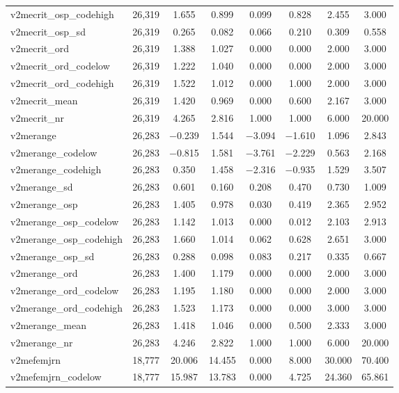 \begin{table}[!htbp]
\begin{tabular}{@{\extracolsep{5pt}}lccccccc}
v2mecrit\_osp\_codehigh & 26,319 & 1.655 & 0.899 & 0.099 & 0.828 & 2.455 & 3.000 \\ 
v2mecrit\_osp\_sd & 26,319 & 0.265 & 0.082 & 0.066 & 0.210 & 0.309 & 0.558 \\ 
v2mecrit\_ord & 26,319 & 1.388 & 1.027 & 0.000 & 0.000 & 2.000 & 3.000 \\ 
v2mecrit\_ord\_codelow & 26,319 & 1.222 & 1.040 & 0.000 & 0.000 & 2.000 & 3.000 \\ 
v2mecrit\_ord\_codehigh & 26,319 & 1.522 & 1.012 & 0.000 & 1.000 & 2.000 & 3.000 \\ 
v2mecrit\_mean & 26,319 & 1.420 & 0.969 & 0.000 & 0.600 & 2.167 & 3.000 \\ 
v2mecrit\_nr & 26,319 & 4.265 & 2.816 & 1.000 & 1.000 & 6.000 & 20.000 \\ 
v2merange & 26,283 & $-$0.239 & 1.544 & $-$3.094 & $-$1.610 & 1.096 & 2.843 \\ 
v2merange\_codelow & 26,283 & $-$0.815 & 1.581 & $-$3.761 & $-$2.229 & 0.563 & 2.168 \\ 
v2merange\_codehigh & 26,283 & 0.350 & 1.458 & $-$2.316 & $-$0.935 & 1.529 & 3.507 \\ 
v2merange\_sd & 26,283 & 0.601 & 0.160 & 0.208 & 0.470 & 0.730 & 1.009 \\ 
v2merange\_osp & 26,283 & 1.405 & 0.978 & 0.030 & 0.419 & 2.365 & 2.952 \\ 
v2merange\_osp\_codelow & 26,283 & 1.142 & 1.013 & 0.000 & 0.012 & 2.103 & 2.913 \\ 
v2merange\_osp\_codehigh & 26,283 & 1.660 & 1.014 & 0.062 & 0.628 & 2.651 & 3.000 \\ 
v2merange\_osp\_sd & 26,283 & 0.288 & 0.098 & 0.083 & 0.217 & 0.335 & 0.667 \\ 
v2merange\_ord & 26,283 & 1.400 & 1.179 & 0.000 & 0.000 & 2.000 & 3.000 \\ 
v2merange\_ord\_codelow & 26,283 & 1.195 & 1.180 & 0.000 & 0.000 & 2.000 & 3.000 \\ 
v2merange\_ord\_codehigh & 26,283 & 1.523 & 1.173 & 0.000 & 0.000 & 3.000 & 3.000 \\ 
v2merange\_mean & 26,283 & 1.418 & 1.046 & 0.000 & 0.500 & 2.333 & 3.000 \\ 
v2merange\_nr & 26,283 & 4.246 & 2.822 & 1.000 & 1.000 & 6.000 & 20.000 \\ 
v2mefemjrn & 18,777 & 20.006 & 14.455 & 0.000 & 8.000 & 30.000 & 70.400 \\ 
v2mefemjrn\_codelow & 18,777 & 15.987 & 13.783 & 0.000 & 4.725 & 24.360 & 65.861 \\ 

\end{tabular}
\end{table}
